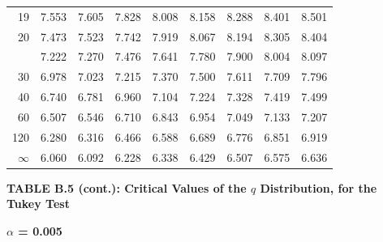 \documentclass[10pt]{article}
\begin{document}
\begin{longtable}{@{}r!{\vrule width 0.8pt\hspace{0.55em}}rrrrrrrr@{}}
19 & 7.553 & 7.605 & 7.828 & 8.008 & 8.158 & 8.288 & 8.401 & 8.501 \\
20 & 7.473 & 7.523 & 7.742 & 7.919 & 8.067 & 8.194 & 8.305 & 8.404 \\
 & 7.222 & 7.270 & 7.476 & 7.641 & 7.780 & 7.900 & 8.004 & 8.097 \\
30 & 6.978 & 7.023 & 7.215 & 7.370 & 7.500 & 7.611 & 7.709 & 7.796 \\
40 & 6.740 & 6.781 & 6.960 & 7.104 & 7.224 & 7.328 & 7.419 & 7.499 \\
60 & 6.507 & 6.546 & 6.710 & 6.843 & 6.954 & 7.049 & 7.133 & 7.207 \\
120 & 6.280 & 6.316 & 6.466 & 6.588 & 6.689 & 6.776 & 6.851 & 6.919 \\
\addlinespace[0.30em]
$\infty$ & 6.060 & 6.092 & 6.228 & 6.338 & 6.429 & 6.507 & 6.575 & 6.636 \\
\end{longtable}
\newpage
\thispagestyle{empty}
\begin{center}
{\large\bfseries TABLE B.5 (cont.): Critical Values of the $q$ Distribution, for the Tukey Test\par}
\end{center}
{\large\bfseries $\alpha$ = 0.005\par}
\vspace{0.45em}
\small
\end{document}
